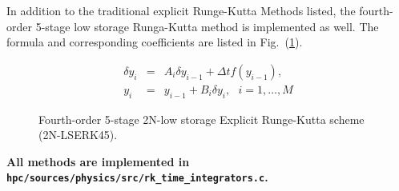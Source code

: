 \documentclass[11pt]{book}
\begin{document}
\begin{appendices}
In addition to the traditional explicit Runge-Kutta Methods listed, the fourth-order 5-stage  low storage Runga-Kutta method is implemented as well.
The formula and corresponding coefficients are listed in Fig.~(\ref{LSRK-Methods}).
\begin{figure}[h]
\begin{eqnarray*}
\delta y_i &=& A_i \delta y_{i-1} + \Delta t f\left(y_{i-1} \right),\\
 y_i &=& y_{i-1} + B_i \delta y_{i}, \ \ \ i=1,\ldots,M
\end{eqnarray*}
 \begin{subfigmatrix}{3}%
 \end{subfigmatrix}
 \caption{Fourth-order 5-stage 2N-low storage Explicit Runge-Kutta scheme (2N-LSERK45).}
 \label{LSRK-Methods}
\end{figure}

\noindent
\textbf{All methods are implemented in \texttt{hpc/sources/physics/src/rk\_time\_integrators.c}.}


\end{appendices}
\end{document}
